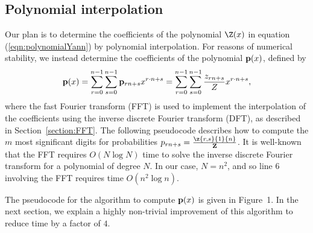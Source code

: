 \subsection{Polynomial interpolation}
Our plan is to determine the coefficients of the polynomial
$\Z(x)$ in equation (\ref{eqn:polynomialYann}) by
polynomial interpolation.  For reasons of numerical stability,
we instead determine the coefficients of the polynomial ${\bf p}(x)$,
defined by
\begin{eqnarray}
\label{eqn:polynomialYannP}
{\bf p}(x) =
\sum_{r=0}^{n-1} \sum_{s=0}^{n-1}  {\bf p}_{rn+s}
 x^{r\cdot n + s} =
\sum_{r=0}^{n-1} \sum_{s=0}^{n-1}  \frac{z_{rn+s}}{Z}
 x^{r\cdot n + s},
\end{eqnarray}
where the fast Fourier transform (FFT) is used to implement the
interpolation of
the coefficients using the inverse discrete Fourier transform (DFT), as
described in Section~\ref{section:FFT}.  The following pseudocode describes how
to compute the $m$ most significant digits
for probabilities
$p_{rn+s} = \frac{\z{r,s}{1}{n}}{{\bf Z}}$. It is well-known that
the FFT requires $O(N \log N)$ time to solve the inverse discrete
Fourier transform for a polynomial of degree $N$. In our case,
$N=n^2$, and so line 6 involving the FFT requires time $O(n^2 \log n)$.

The pseudocode for the algorithm to compute ${\bf p}(x)$ is given in
Figure~1.
In the next section, we explain a highly non-trivial improvement of
this algorithm to reduce time by a factor of $4$.

